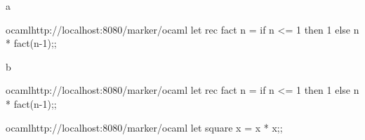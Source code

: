 


    \begin{question}{1}
        \begin{subquestion}{a}
            \begin{automarkable}{ocaml}{http://localhost:8080/marker/ocaml}
                let rec fact n =
                  if n <= 1 then 1 else n * fact(n-1);;
            \end{automarkable}
        \end{subquestion}
        \begin{subquestion}{b}
            \begin{automarkable}{ocaml}{http://localhost:8080/marker/ocaml}
                let rec fact n =
                  if n <= 1 then 1 else n * fact(n-1);;
            \end{automarkable}
        \end{subquestion}
    \end{question}

    \begin{question}{2}
        \begin{automarkable}{ocaml}{http://localhost:8080/marker/ocaml}
            let square x = x * x;;
        \end{automarkable}
    \end{question}
